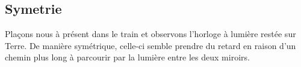 


\subsection{Symetrie}

Plaçons nous à présent dans le train et observons l'horloge à lumière restée sur Terre. De manière symétrique, celle-ci semble prendre du retard en raison d'un chemin plus long à parcourir par la lumière entre les deux miroirs.

